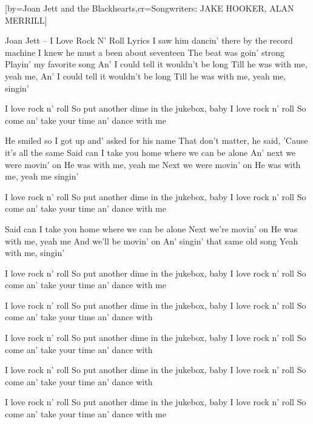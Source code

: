  

[by={Joan Jett and the Blackhearts},cr={Songwriters: JAKE HOOKER, ALAN MERRILL}]




\beginverse
Joan Jett – I Love Rock N' Roll Lyrics
I saw him dancin' there by the record machine 
I knew he must a been about seventeen 
The beat was goin' strong 
Playin' my favorite song 
An' I could tell it wouldn't be long 
Till he was with me, yeah me, 
An' I could tell it wouldn't be long 
Till he was with me, yeah me, singin' 

I love rock n' roll 
So put another dime in the jukebox, baby 
I love rock n' roll 
So come an' take your time an' dance with me 

He smiled so I got up and' asked for his name 
That don't matter, he said, 
'Cause it's all the same 
Said can I take you home where we can be alone 
An' next we were movin' on 
He was with me, yeah me 
Next we were movin' on 
He was with me, yeah me singin'

I love rock n' roll 
So put another dime in the jukebox, baby 
I love rock n' roll 
So come an' take your time an' dance with me 

Said can I take you home where we can be alone 
Next we're movin' on
He was with me, yeah me 
And we'll be movin' on 
An' singin' that same old song 
Yeah with me, singin' 

I love rock n' roll 
So put another dime in the jukebox, baby 
I love rock n' roll 
So come an' take your time an' dance with me

I love rock n' roll 
So put another dime in the jukebox, baby 
I love rock n' roll 
So come an' take your time an' dance with

I love rock n' roll 
So put another dime in the jukebox, baby 
I love rock n' roll 
So come an' take your time an' dance with 

I love rock n' roll 
So put another dime in the jukebox, baby 
I love rock n' roll 
So come an' take your time an' dance with 

I love rock n' roll 
So put another dime in the jukebox, baby 
I love rock n' roll 
So come an' take your time an' dance with me


\endverse




\endsong
